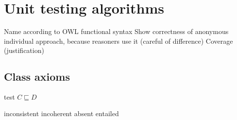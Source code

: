 \documentclass[paper.tex]{subfiles}
\begin{document}
\section{Unit testing algorithms}
\label{sec:algorithms}

\begin{todos}
  \todo Name according to OWL functional syntax
  \todo Show correctness of anonymous individual approach, because reasoners use it (careful of difference)
  \todo Coverage (justification)
\end{todos}

\subsection{Class axioms}

\begin{algorithm}[H]
  \caption{test $C \sqsubseteq D$}
  \begin{algorithmic}[1]
    \raggedright
        \State \Return inconsistent
        \State \Return incoherent
        \State \Return absent
      \Else
        \State \Return entailed
      \EndIf
    \EndFunction
  \end{algorithmic}
\end{algorithm}
\end{document}
